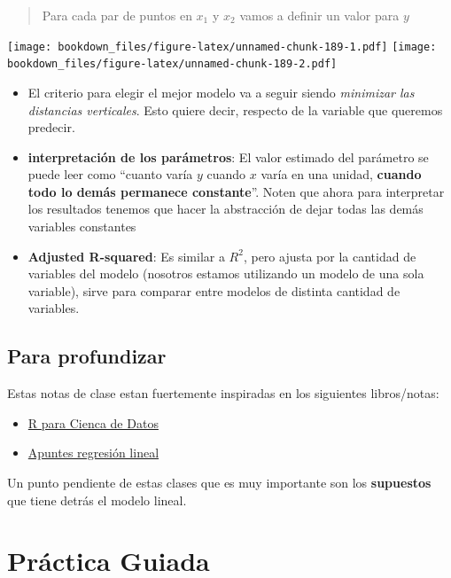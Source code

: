 \documentclass[]{book}
\providecommand{\tightlist}{%
  \setlength{\itemsep}{0pt}\setlength{\parskip}{0pt}}
\begin{document}
\begin{quote}
Para cada par de puntos en \(x_1\) y \(x_2\) vamos a definir un valor para \(y\)
\end{quote}

\texttt{[image: bookdown\_files/figure-latex/unnamed-chunk-189-1.pdf]} \texttt{[image: bookdown\_files/figure-latex/unnamed-chunk-189-2.pdf]}

\begin{itemize}
\item
  El criterio para elegir el mejor modelo va a seguir siendo \emph{minimizar las distancias verticales}. Esto quiere decir, respecto de la variable que queremos predecir.
\item
  \textbf{interpretación de los parámetros}: El valor estimado del parámetro se puede leer como ``cuanto varía \(y\) cuando \(x\) varía en una unidad, \textbf{cuando todo lo demás permanece constante}''. Noten que ahora para interpretar los resultados tenemos que hacer la abstracción de dejar todas las demás variables constantes
\item
  \textbf{Adjusted R-squared}: Es similar a \(R^2\), pero ajusta por la cantidad de variables del modelo (nosotros estamos utilizando un modelo de una sola variable), sirve para comparar entre modelos de distinta cantidad de variables.
\end{itemize}

\hypertarget{para-profundizar}{%
\subsection{Para profundizar}\label{para-profundizar}}

Estas notas de clase estan fuertemente inspiradas en los siguientes libros/notas:

\begin{itemize}
\tightlist
\item
  \href{https://es.r4ds.hadley.nz/}{R para Cienca de Datos}
\item
  \href{http://mate.dm.uba.ar/~meszre/apunte_regresion_lineal_szretter.pdf}{Apuntes regresión lineal}
\end{itemize}

Un punto pendiente de estas clases que es muy importante son los \textbf{supuestos} que tiene detrás el modelo lineal.

\hypertarget{practica-guiada-7}{%
\section{Práctica Guiada}\label{practica-guiada-7}}
\end{document}
